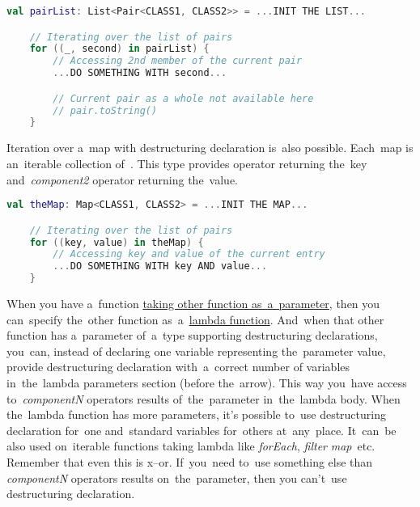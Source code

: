 \begin{lstlisting}[language=Kotlin]
    val pairList: List<Pair<CLASS1, CLASS2>> = ...INIT THE LIST...

    // Iterating over the list of pairs
    for ((_, second) in pairList) {
        // Accessing 2nd member of the current pair
        ...DO SOMETHING WITH second...

        // Current pair as a whole not available here
        // pair.toString()
    }
\end{lstlisting}
\newline
\newline

\noindent Iteration over a~map with destructuring declaration is~also possible.
Each~map is an~iterable collection \mbox{of }.
This type provides  operator returning the~key \mbox{and \textit{component2}} operator returning the~value.
\newpage

\begin{lstlisting}[language=Kotlin]
    val theMap: Map<CLASS1, CLASS2> = ...INIT THE MAP...

    // Iterating over the list of pairs
    for ((key, value) in theMap) {
        // Accessing key and value of the current entry
        ...DO SOMETHING WITH key AND value...
    }
\end{lstlisting}
\newline

When you have a~function \hyperref[kotlinanonymousfunction]{taking other function as~a~parameter}, then you can~specify the~other function as~a~\hyperref[kotlinlambda]{lambda function}.
And~when that other function has a~parameter of~a~type supporting destructuring declarations, you~can, instead of declaring one variable representing the~parameter value, provide destructuring declaration with~a~correct number of variables in~the~lambda parameters section (before the~arrow).
This way you~have access \mbox{to \textit{componentN}} operators results of~the~parameter in~the~lambda body.
When the~lambda function has more parameters, it's possible to~use destructuring declaration for~one and~standard variables for~others at~any~place.
It~can~be also used on~iterable functions taking lambda like \mbox{\textit{forEach},} \mbox{\textit{filter}} \mbox{\textit{map} etc.}
Remember that even this is x--or.
If~you~need to~use something else than \textit{componentN} operators results on~the~parameter, then you can't~use destructuring declaration.
\newline

